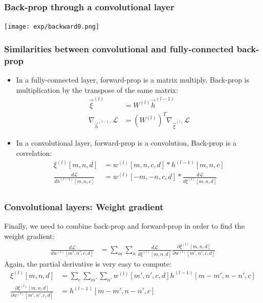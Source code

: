 \documentclass{beamer}
\begin{document}
\begin{frame}
  \frametitle{Back-prop through a convolutional layer}

  \centerline{\texttt{[image: exp/backward0.png]}}
\end{frame}

\begin{frame}
  \frametitle{Similarities between convolutional and fully-connected back-prop}

  \begin{itemize}
  \item In a fully-connected layer, forward-prop is a matrix multiply.
    Back-prop is multiplication by the transpose of the same matrix:
    \begin{align*}
      \vec{\xi}^{(l)} &= W^{(l)}\vec{h}^{(l-1)}\\
      \nabla_{\vec{h}^{(l-1)}}{\mathcal L} &= \left(W^{(l)}\right)^T\nabla_{\vec{\xi}^{(l)}}{\mathcal L}
    \end{align*}
  \item In a convolutional layer, forward-prop is a convolution,
    Back-prop is a correlation:
    \begin{align*}
    \xi^{(l)}[m,n,d] &= w^{(l)}[m,n,c,d] \ast h^{(l-1)}[m,n,c]\\
    \frac{d{\mathcal L}}{dh^{(l-1)}[m,n,c]} &=
    w^{(l)}[-m,-n,c,d] \ast \frac{d{\mathcal L}}{d\xi^{(l)}[m,n,d]}\\
    \end{align*}
  \end{itemize}
\end{frame}
    
\begin{frame}
  \frametitle{Convolutional layers: Weight gradient}

  Finally, we need to combine back-prop and forward-prop in order to
  find  the weight gradient:
  \begin{align*}
    \frac{d{\mathcal L}}{dw^{(l)}[m',n',c,d]} &=
    \sum_{m}\sum_n\frac{d{\mathcal L}}{d\xi^{(l)}[m,n,d]}
    \frac{\partial\xi^{(l)}[m,n,d]}{\partial w^{(l)}[m',n',c,d]}
  \end{align*}
  Again, the partial derivative is very easy to compute:
  \begin{align*}
    \xi^{(l)}[m,n,d] &= \sum_c\sum_{m'}\sum_{n'} w^{(l)}[m',n',c,d]h^{(l-1)}[m-m',n-n',c]\\
    \frac{\partial\xi^{(l)}[m,n,d]}{\partial w^{(l)}[m',n',c,d]} &= h^{(l-1)}[m-m',n-n',c]
  \end{align*}
\end{frame}
\end{document}
